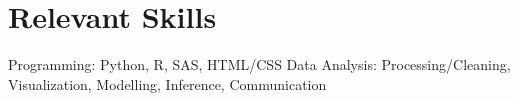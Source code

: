 \documentclass[11pt,a4paper,]{awesome-cv}
\begin{document}
\begin{cventries}
    \vspace{-4.0mm}
    \vspace{-4.0mm}
\end{cventries}

\hypertarget{relevant-skills}{%
\section{Relevant Skills}\label{relevant-skills}}

\begin{cvskills}
  \cvskill
    {Programming:}
    {Python, R, SAS, HTML/CSS}
  \cvskill
    {Data Analysis:}
    {Processing/Cleaning, Visualization, Modelling, Inference, Communication}
  \end{cvskills}


\label{LastPage}~
\end{document}
